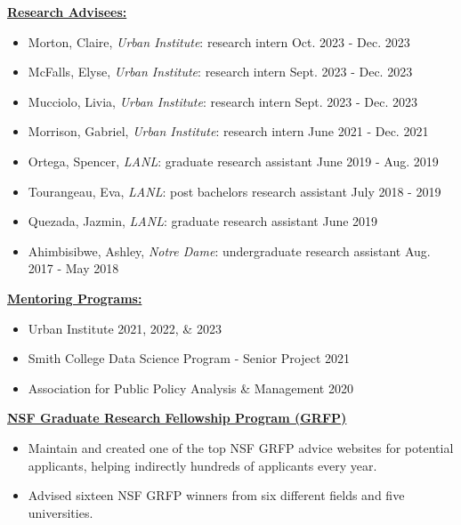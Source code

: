 
\underline{\textbf{\large Research Advisees:}}\normalsize

    \begin{itemize}
        \item Morton, Claire, \textit{Urban Institute}: research intern \hfill Oct. 2023 - Dec. 2023
        \item McFalls, Elyse, \textit{Urban Institute}: research intern \hfill Sept. 2023 - Dec. 2023
        \item Mucciolo, Livia, \textit{Urban Institute}: research intern \hfill Sept. 2023 - Dec. 2023
        \item Morrison, Gabriel, \textit{Urban Institute}: research intern \hfill June 2021 - Dec. 2021
        \item Ortega, Spencer, \textit{LANL}: graduate research assistant \hfill June 2019 - Aug. 2019
        \item Tourangeau, Eva, \textit{LANL}: post bachelors research assistant \hfill July 2018 - 2019
        \item Quezada, Jazmin, \textit{LANL}: graduate research assistant \hfill June 2019
        \item Ahimbisibwe, Ashley, \textit{Notre Dame}: undergraduate research assistant \hfill Aug. 2017 - May 2018
    \end{itemize}

\vspace{4pt}
\underline{\textbf{\large Mentoring Programs:}}\normalsize

    \begin{itemize}
        \item Urban Institute \hfill 2021, 2022, \& 2023
        \item Smith College Data Science Program - Senior Project \hfill 2021
        \item Association for Public Policy Analysis \& Management \hfill 2020
    \end{itemize}

\vspace{4pt}
\underline{\textbf{\large NSF Graduate Research Fellowship Program (GRFP)}}\normalsize
    \begin{itemize}
        \item Maintain and created one of the top NSF GRFP advice websites for potential applicants, helping indirectly hundreds of applicants every year.
        \item Advised sixteen NSF GRFP winners from six different fields and five universities.
    \end{itemize}

